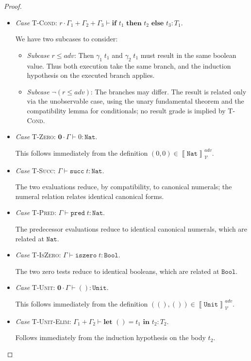 \documentclass[conference]{IEEEtran}
\newcommand\une[2]{\textbf{let }\unt=#1\textbf{ in }#2}
\newcommand\false{\texttt{false}}
\newcommand\bool{\texttt{Bool}}
\newcommand\nat{\texttt{Nat}}
\newcommand\suc[1]{\texttt{succ}\; #1}
\newcommand\prd[1]{\texttt{pred}\; #1}
\newcommand\iszero[1]{\texttt{iszero}\; #1}
\newcommand\unt{()}
\newcommand\untt{\texttt{Unit}}
\newcommand\cond[3]{\textbf{if }#1\textbf{ then }#2\textbf{ else }#3}
\newcommand\srzero{\textbf{0}}
\newcommand\calv{\mathcal{V}}
\newcommand\bbrac[1]{\left\llbracket #1\right\rrbracket}
\begin{document}
\begin{proof}
\begin{itemize}
        This follows immediately from the definition $(\false,\false)\in\bbrac{\bool}^{adv}_\calv$.
        
        \item \emph{Case} \textsc{T-Cond}: $r\cdot\Gamma_1+\Gamma_2+\Gamma_3\vdash\cond{t_1}{t_2}{t_3}:T_1$.
        
        We have two subcases to consider:
        \begin{itemize}
            \item \emph{Subcase} $r\le adv$: Then $\gamma_1\; t_1$ and $\gamma_2\; t_1$ must result in the same boolean value. Thus both execution take the same branch, and the induction hypothesis on the executed branch applies.
            \item \emph{Subcase} $\neg(r\le adv)$: The branches may differ. The result is related only via the unobservable case, using the unary fundamental theorem and the compatibility lemma for conditionals; no result grade is implied by \textsc{T-Cond}.
        \end{itemize}
        
        \item \emph{Case} \textsc{T-Zero}: $\srzero\cdot\Gamma\vdash 0:\nat$.
        
        This follows immediately from the definition $(0,0)\in\bbrac{\nat}^{adv}_\calv$.
        
        \item \emph{Case} \textsc{T-Succ}: $\Gamma\vdash\suc{t}:\nat$.
        
        The two evaluations reduce, by compatibility, to canonical numerals; the numeral relation relates identical canonical forms.
        
        \item \emph{Case} \textsc{T-Pred}: $\Gamma\vdash\prd{t}:\nat$.
        
        The predecessor evaluations reduce to identical canonical numerals, which are related at $\nat$.
        
        \item \emph{Case} \textsc{T-IsZero}: $\Gamma\vdash\iszero{t}:\bool$.
        
        The two zero tests reduce to identical booleans, which are related at $\bool$.
        
        \item \emph{Case} \textsc{T-Unit}: $\srzero\cdot\Gamma\vdash\unt:\untt$.
        
        This follows immediately from the definition $(\unt,\unt)\in\bbrac{\untt}^{adv}_\calv$.
        
        \item \emph{Case} \textsc{T-Unit-Elim}: $\Gamma_1+\Gamma_2\vdash\une{t_1}{t_2}:T_2$.
        
        Follows immediately from the induction hypothesis on the body $t_2$.
    \end{itemize}
\end{proof}
\end{document}
